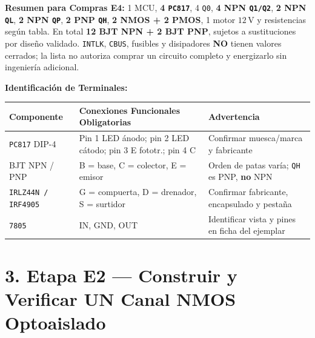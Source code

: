 \documentclass[10pt, a4paper, landscape]{article}
\begin{document}
\vspace{0.12cm}
\noindent
\begin{minipage}[t]{0.47\linewidth}
\textbf{Resumen para Compras E4:}
{\footnotesize 1 MCU, \textbf{4 \texttt{PC817}}, 4 \texttt{Q0}, \textbf{4 NPN \texttt{Q1/Q2}}, \textbf{2 NPN \texttt{QL}}, \textbf{2 NPN \texttt{QP}}, \textbf{2 PNP \texttt{QH}}, \textbf{2 NMOS + 2 PMOS}, 1 motor $12\,\text{V}$ y resistencias según tabla. En total \textbf{12 BJT NPN + 2 BJT PNP}, sujetos a sustituciones por diseño validado. \texttt{INTLK}, \texttt{CBUS}, fusibles y disipadores \textbf{NO} tienen valores cerrados; la lista no autoriza comprar un circuito completo y energizarlo sin ingeniería adicional.}
\end{minipage}\hfill
\begin{minipage}[t]{0.51\linewidth}
\textbf{Identificación de Terminales:}
\par\vspace{0.04cm}
{\scriptsize
\renewcommand{\arraystretch}{1.12}%
\noindent\begin{tabularx}{\linewidth}{|l|>{\raggedright\arraybackslash}X|>{\raggedright\arraybackslash}p{4.3cm}|}
\hline
\rowcolor{ucbgray}
\textbf{Componente} & \textbf{Conexiones Funcionales Obligatorias} & \textbf{Advertencia} \\ \hline
\texttt{PC817} DIP-4 & Pin 1 LED ánodo; pin 2 LED cátodo; pin 3 E fototr.; pin 4 C & Confirmar muesca/marca y fabricante \\ \hline
BJT NPN / PNP & B = base, C = colector, E = emisor & Orden de patas varía; \texttt{QH} es PNP, \textbf{no} NPN \\ \hline
\texttt{IRLZ44N / IRF4905} & G = compuerta, D = drenador, S = surtidor & Confirmar fabricante, encapsulado y pestaña \\ \hline
\texttt{7805} & IN, GND, OUT & Identificar vista y pines en ficha del ejemplar \\ \hline
\end{tabularx}\par}
\end{minipage}

\newpage
\section*{3. Etapa E2 — Construir y Verificar UN Canal NMOS Optoaislado}
\end{document}
